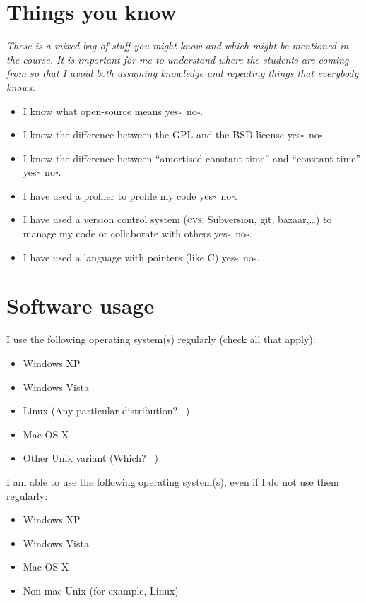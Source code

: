 \documentclass[article,twoside]{memoir}
\newcommand*{\fillunderscore}{~\hrulefill}
\newcommand*{\checkbox}{$\square$}
\newcommand*{\yesno}{\hfill\mbox{yes\checkbox~no\checkbox}}
\newcommand{\header}[1]{\textsl{#1}}
\begin{document}
\section{Things you know}
\header{These is a mixed-bag of stuff you might know and which might be mentioned in the course. It is important for me to understand where the students are coming from so that I avoid both assuming knowledge and repeating things that everybody knows.}

\begin{itemize}
\item I know what open-source means \yesno.
\item I know the difference between the GPL and the BSD license \yesno.
\item I know the difference between ``amortised constant time'' and ``constant time'' \yesno.
\item I have used a profiler to profile my code \yesno.
\item I have used a version control system (\textsc{cvs}, Subversion, git, bazaar,\dots) to manage my code or collaborate with others \yesno.
\item I have used a language with pointers (like C) \yesno.
\end{itemize}


\section{Software usage}

I use the following operating system(s) regularly (check all that apply):
\begin{itemize}[\checkbox]
\item Windows XP
\item Windows Vista
\item Linux (Any particular distribution? \fillunderscore)
\item Mac OS X
\item Other Unix variant (Which? \fillunderscore)
\end{itemize}

\medskip

I am able to use the following operating system(s), even if I do not use them regularly:
\begin{itemize}[\checkbox]
\item Windows XP
\item Windows Vista
\item Mac OS X
\item Non-mac Unix (for example, Linux)
\end{itemize}
\end{document}
